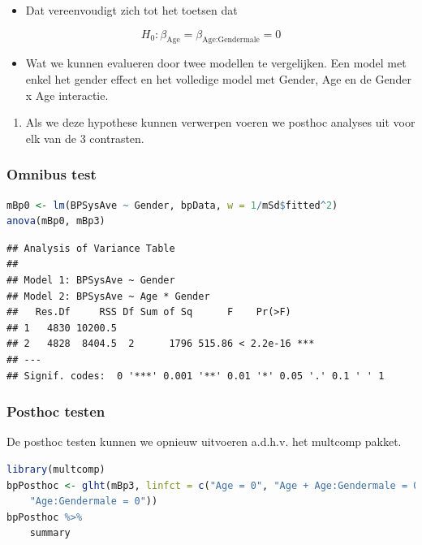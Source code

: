 \documentclass[
  12pt,dutch,coursenotes]{book}
\providecommand{\tightlist}{%
  \setlength{\itemsep}{0pt}\setlength{\parskip}{0pt}}
\theoremstyle{definition}
\theoremstyle{definition}
\theoremstyle{definition}
\theoremstyle{definition}
\theoremstyle{remark}
\begin{document}
\begin{itemize}
\tightlist
\item
  Dat vereenvoudigt zich tot het toetsen dat
\end{itemize}

\[
H_0: \beta_\text{Age} = \beta_\text{Age:Gendermale} = 0
\]

\begin{itemize}
\tightlist
\item
  Wat we kunnen evalueren door twee modellen te vergelijken. Een model met enkel het gender effect en het volledige model met Gender, Age en de Gender x Age interactie.
\end{itemize}

\begin{enumerate}
\def\labelenumi{\arabic{enumi}.}
\setcounter{enumi}{1}
\tightlist
\item
  Als we deze hypothese kunnen verwerpen voeren we posthoc analyses uit voor elk van de 3 contrasten.
\end{enumerate}

\hypertarget{omnibus-test}{%
\subsubsection{Omnibus test}\label{omnibus-test}}

\begin{lstlisting}[language=R]
mBp0 <- lm(BPSysAve ~ Gender, bpData, w = 1/mSd$fitted^2)
anova(mBp0, mBp3)
\end{lstlisting}

\begin{lstlisting}
## Analysis of Variance Table
## 
## Model 1: BPSysAve ~ Gender
## Model 2: BPSysAve ~ Age * Gender
##   Res.Df     RSS Df Sum of Sq      F    Pr(>F)    
## 1   4830 10200.5                                  
## 2   4828  8404.5  2      1796 515.86 < 2.2e-16 ***
## ---
## Signif. codes:  0 '***' 0.001 '**' 0.01 '*' 0.05 '.' 0.1 ' ' 1
\end{lstlisting}

\hypertarget{posthoc-testen}{%
\subsubsection{Posthoc testen}\label{posthoc-testen}}

De posthoc testen kunnen we opnieuw uitvoeren a.d.h.v. het multcomp pakket.

\begin{lstlisting}[language=R]
library(multcomp)
bpPosthoc <- glht(mBp3, linfct = c("Age = 0", "Age + Age:Gendermale = 0",
    "Age:Gendermale = 0"))
bpPosthoc %>%
    summary
\end{lstlisting}
\end{document}
